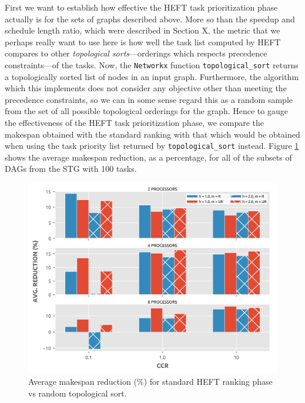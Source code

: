 \documentclass[12pt]{article}
\begin{document}
First we want to establish how effective the HEFT task prioritization phase actually is for the sets of graphs described above. More so than the speedup and schedule length ratio, which were described in Section X, the metric that we perhaps really want to use here is how well the task list computed by HEFT compares to other {\em topological sorts}---orderings which respects precedence constraints---of the tasks. Now, the {\tt Networkx} function {\tt topological\_sort} returns a topologically sorted list of nodes in an input graph. Furthermore, the algorithm which this implements does not consider any objective other than meeting the precedence constraints, so we can in some sense regard this as a random sample from the set of all possible topological orderings for the graph. Hence to gauge the effectiveness of the HEFT task prioritization phase, we compare the makespan obtained with the standard ranking with that which would be obtained when using the task priority list returned by {\tt topological\_sort} instead. Figure \ref{plot.benchmark_reductions_100} shows the average makespan reduction, as a percentage, for all of the subsets of DAGs from the STG with 100 tasks.

\begin{figure}
	\centering	
	\includegraphics[scale=0.8]{100tasks_reductions.png}
	\caption{Average makespan reduction (\%) for standard HEFT ranking phase vs random topological sort.}	
	\label{plot.benchmark_reductions_100}
\end{figure} 
\end{document}
